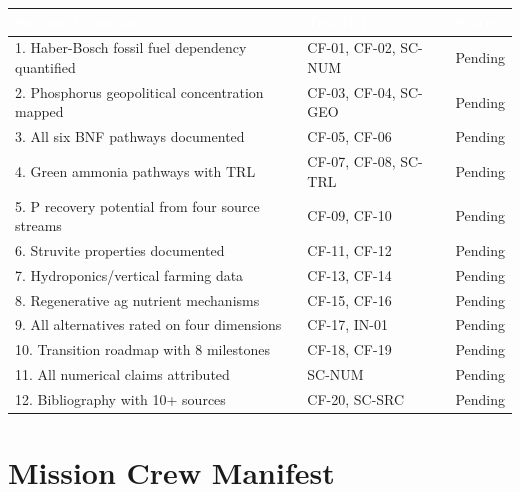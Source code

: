 \documentclass[11pt,letterpaper]{article}
\newcommand{\tableheader}[1]{\textbf{\sffamily\textcolor{white}{#1}}}
\begin{document}
\begin{center}
\begin{tabularx}{\textwidth}{XL{3.5cm}C{1.5cm}}
\toprule
{}
\tableheader{Success Criterion} & \tableheader{Test ID(s)} & \tableheader{Status} \\
. Haber-Bosch fossil fuel dependency quantified & CF-01, CF-02, SC-NUM & Pending \\
2. Phosphorus geopolitical concentration mapped & CF-03, CF-04, SC-GEO & Pending \\
3. All six BNF pathways documented & CF-05, CF-06 & Pending \\
4. Green ammonia pathways with TRL & CF-07, CF-08, SC-TRL & Pending \\
5. P recovery potential from four source streams & CF-09, CF-10 & Pending \\
6. Struvite properties documented & CF-11, CF-12 & Pending \\
7. Hydroponics/vertical farming data & CF-13, CF-14 & Pending \\
8. Regenerative ag nutrient mechanisms & CF-15, CF-16 & Pending \\
9. All alternatives rated on four dimensions & CF-17, IN-01 & Pending \\
10. Transition roadmap with 8 milestones & CF-18, CF-19 & Pending \\
11. All numerical claims attributed & SC-NUM & Pending \\
12. Bibliography with 10+ sources & CF-20, SC-SRC & Pending \\
\bottomrule
\end{tabularx}
\end{center}

\section{Mission Crew Manifest}
\end{document}
